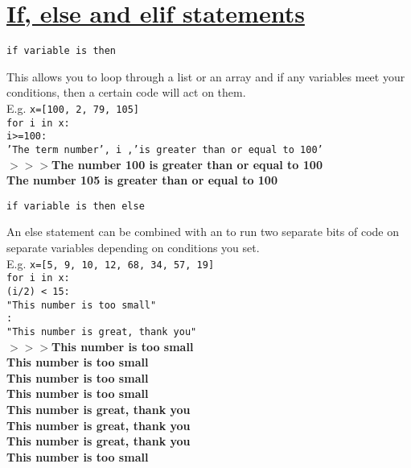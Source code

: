 \section*{\underline{If, else and elif statements}}

\noindent \texttt{if variable is \lfill then \lfill}
\begin{myindentpar}{1.1cm}
\vspace*{-1ex}
This allows you to loop through a list or an array and if any variables meet your conditions, then a certain code will act on them.\\
E.g. \texttt{x=[100, 2, 79, 105]\\
{\color{orange}for} i {\color{orange}in} x:\\
 i>=100: \\
 'The term number', i ,'is greater than or equal to 100'} \\
\textbf{$>>>$The number 100 is greater than or equal to 100\\
\phantom{$>>>$}The number 105 is greater than or equal to  100}
\end{myindentpar}

\noindent \texttt{if variable is \lfill then \lfill else \lfill}
\begin{myindentpar}{1.4cm}
\vspace*{-1ex}
An else statement can be combined with an to run two separate bits of code on separate variables depending on conditions you set.\\
E.g. \texttt{x=[5, 9, 10, 12, 68, 34, 57, 19]\\
{\color{orange}for} i {\color{orange}in} x:\\
 (i/2) < 15: \\
 "This number is too small"\\
:\\
 "This number is great, thank you"}\\
\textbf{$>>>$This number is too small\\
\phantom{$>>>$}This number is too small\\
\phantom{$>>>$}This number is too small\\
\phantom{$>>>$}This number is too small\\
\phantom{$>>>$}This number is great, thank you\\
\phantom{$>>>$}This number is great, thank you\\
\phantom{$>>>$}This number is great, thank you\\
\phantom{$>>>$}This number is too small}
\end{myindentpar}

